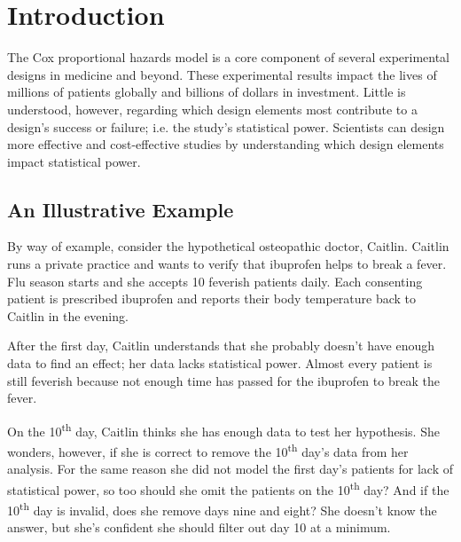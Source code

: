 \section{Introduction}

The Cox proportional hazards model \cite{cox} is a core component of several experimental designs in medicine and beyond. These experimental results impact the lives of millions of patients globally and billions of dollars in investment. Little is understood, however, regarding which design elements most contribute to a design's success or failure; i.e. the study's statistical power. Scientists can design more effective and cost-effective studies by understanding which design elements impact statistical power\footnotemark.


\subsection{An Illustrative Example}

By way of example, consider the hypothetical osteopathic doctor, Caitlin. Caitlin runs a private practice and wants to verify that ibuprofen helps to break a fever. Flu season starts and she accepts 10 feverish patients daily. Each consenting patient is prescribed ibuprofen and reports their body temperature back to Caitlin in the evening. 

After the first day, Caitlin understands that she probably doesn't have enough data to find an effect; her data lacks statistical power. Almost every patient is still feverish because not enough time has passed for the ibuprofen to break the fever. 

On the 10\textsuperscript{th} day, Caitlin thinks she has enough data to test her hypothesis. She wonders, however, if she is correct to remove the 10\textsuperscript{th} day's data from her analysis. For the same reason she did not model the first day's patients for lack of statistical power, so too should she omit the patients on the 10\textsuperscript{th} day? And if the 10\textsuperscript{th} day is invalid, does she remove days nine and eight? She doesn't know the answer, but she's confident she should filter out day 10 at a minimum. 

